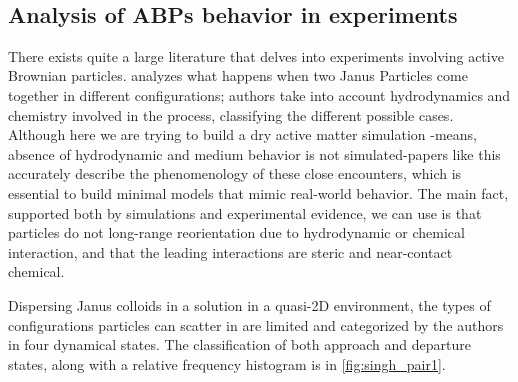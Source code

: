 \documentclass[../../master_thesis_np.tex]{subfiles}
\begin{document}
	\begin{figure}[htp]
		\centering
		 \\
		\caption{\parencite{negi_emergent_2022}}
		\label{fig:negi_vision2}
	\end{figure}
	
	\subsection{Analysis of ABPs behavior in experiments}
	There exists quite a large literature that delves into experiments involving active Brownian particles. \parencite{singh_pair_2024} analyzes what happens when two  Janus Particles come together in different configurations; authors take into account hydrodynamics and chemistry involved in the process, classifying the different possible cases. Although here we are trying to build a dry active matter simulation -means, absence of hydrodynamic and medium behavior is not simulated-papers like this accurately describe the phenomenology of these close encounters, which is essential to build minimal models that mimic real-world behavior. The main fact, supported both by simulations and experimental evidence, we can use is that particles do not long-range reorientation due to hydrodynamic or chemical interaction, and that the leading interactions are steric and near-contact chemical. 
	
	Dispersing Janus colloids in a  solution in a quasi-2D environment, the types of configurations particles can scatter in are limited and categorized by the authors in four dynamical states. The classification of both approach and departure states, along with a relative frequency histogram is in \ref{fig:singh_pair1}.
	
\end{document}

